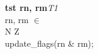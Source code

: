 


\begin{instructionblock}{\imagewidth}%
    \textbf{tst rn, rm}\hfill\textit{T1}\\
    rn, rm $\in$ \baseregisters\\
    {N Z}\\
    update\_flags(rn \& rm);
\end{instructionblock}


